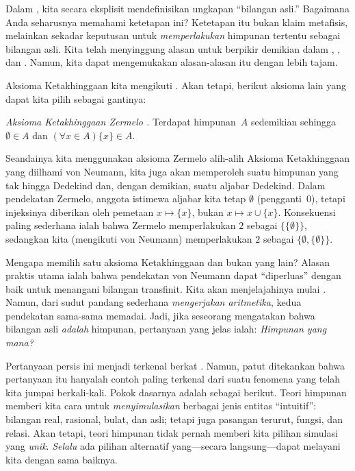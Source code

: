 \documentclass[../../../include/open-logic-section]{subfiles}
\begin{document}
	


Dalam , kita secara eksplisit mendefinisikan
ungkapan ``bilangan asli.'' Bagaimana Anda seharusnya memahami ketetapan ini?
Ketetapan itu bukan klaim metafisis, melainkan sekadar keputusan untuk
\emph{memperlakukan} himpunan tertentu sebagai bilangan asli. Kita telah
menyinggung alasan untuk berpikir demikian dalam
, , dan
. Namun, kita dapat mengemukakan
alasan-alasan itu dengan lebih tajam.

Aksioma Ketakhinggaan kita mengikuti \citet{VonNeumann1925}. Akan tetapi,
berikut aksioma lain yang dapat kita pilih sebagai gantinya:

\begin{defish}
\emph{Aksioma Ketakhinggaan Zermelo
\citeyear{Zermelo1908Untersuchungen}.} Terdapat himpunan~$A$ sedemikian
sehingga $\emptyset\in A$ dan $(\forall x\in A)\{x\}\in A$.
\end{defish}

Seandainya kita menggunakan aksioma Zermelo alih-alih Aksioma Ketakhinggaan
yang diilhami von Neumann, kita juga akan memperoleh suatu himpunan yang tak
hingga Dedekind dan, dengan demikian, suatu aljabar Dedekind. Dalam pendekatan
Zermelo, anggota istimewa aljabar kita tetap $\emptyset$ (pengganti~$0$),
tetapi injeksinya diberikan oleh pemetaan $x\mapsto\{x\}$, bukan
$x\mapsto x\cup\{x\}$. Konsekuensi paling sederhana ialah bahwa Zermelo
memperlakukan $2$ sebagai $\{\{\emptyset\}\}$, sedangkan kita (mengikuti von
Neumann) memperlakukan $2$ sebagai
$\{\emptyset,\{\emptyset\}\}$.

Mengapa memilih satu aksioma Ketakhinggaan dan bukan yang lain? Alasan praktis
utama ialah bahwa pendekatan von Neumann dapat ``diperluas'' dengan baik untuk
menangani bilangan transfinit. Kita akan menjelajahinya mulai
. Namun, dari sudut pandang sederhana
\emph{mengerjakan aritmetika}, kedua pendekatan sama-sama memadai. Jadi, jika
seseorang mengatakan bahwa bilangan asli \emph{adalah} himpunan, pertanyaan
yang jelas ialah: \emph{Himpunan yang mana?}

Pertanyaan persis ini menjadi terkenal berkat \citet{Benacerraf1965}. Namun,
patut ditekankan bahwa pertanyaan itu hanyalah contoh paling terkenal dari
suatu fenomena yang telah kita jumpai berkali-kali. Pokok dasarnya adalah
sebagai berikut. Teori himpunan memberi kita cara untuk \emph{menyimulasikan}
berbagai jenis entitas ``intuitif'': bilangan real, rasional, bulat, dan asli;
tetapi juga pasangan terurut, fungsi, dan relasi. Akan tetapi, teori himpunan
tidak pernah memberi kita pilihan simulasi yang \emph{unik}. \emph{Selalu}
ada pilihan alternatif yang---secara langsung---dapat melayani kita dengan
sama baiknya.
\end{document}
